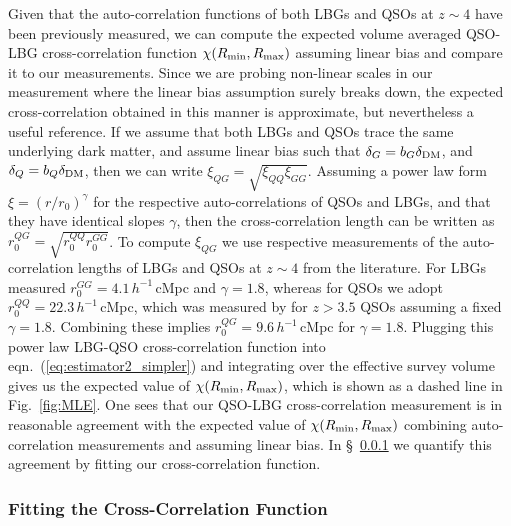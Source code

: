 \documentclass[iop, revtex4]{emulateapj}
\begin{document}
Given that the auto-correlation functions of both LBGs and QSOs at $z\sim 4$
have been previously measured, we can compute the expected volume
averaged QSO-LBG cross-correlation function $\chi(R_{\rm min}, R_{\rm max})$
assuming
linear bias and compare it to our measurements. Since we are probing
non-linear scales in our measurement where the linear bias assumption
surely breaks down, the expected cross-correlation obtained in this manner
is approximate, but nevertheless a useful reference.
If we assume that both LBGs and QSOs trace the same underlying dark matter, and assume linear bias such that $\delta_{G}=b_{G}\delta_{\rm DM}$,  and $\delta_{Q}=b_{Q}\delta_{\rm DM}$, then we can write
$\xi_{QG}=\sqrt{\xi_{QQ} \xi_{GG}}$. Assuming a power law form $\xi = (r/r_0)^\gamma$ for the respective
auto-correlations of QSOs and LBGs, and that they have identical slopes $\gamma$, then the cross-correlation length can be written as $r^{QG}_{0} = \sqrt{ r^{QQ}_{0} r^{GG}_{0}}$.  
To compute $\xi_{QG}$
we use respective measurements of the auto-correlation lengths of LBGs
and QSOs at $z\sim4$ from the literature.  For LBGs \citet{Ouchi04b}
measured $r^{GG}_{0} = 4.1\,h^{-1}$\,cMpc and $\gamma=1.8$, whereas
for QSOs we adopt $r^{QQ}_{0} = 22.3\,h^{-1}$\,cMpc, which was
measured by \citet{Shen07} for $z > 3.5$ QSOs assuming a fixed
$\gamma=1.8$. Combining these implies $r^{QG}_{0}=9.6\,h^{-1}$\,cMpc
for $\gamma=1.8$.  Plugging this power law LBG-QSO cross-correlation
function into eqn.~(\ref{eq:estimator2_simpler}) and integrating over
the effective survey volume gives us the expected value of
$\chi(R_{\rm min}, R_{\rm max})$, which is shown as a dashed line in
Fig.~\ref{fig:MLE}. One sees that our QSO-LBG cross-correlation
measurement is in reasonable agreement with the expected value of
$\chi (R_{\rm min}, R_{\rm max})$ combining auto-correlation measurements and assuming linear
bias. In \S~\ref{sec:fitting} we quantify this agreement by fitting
our cross-correlation function.

\subsubsection{Fitting the Cross-Correlation Function}
\label{sec:fitting}
\end{document}
